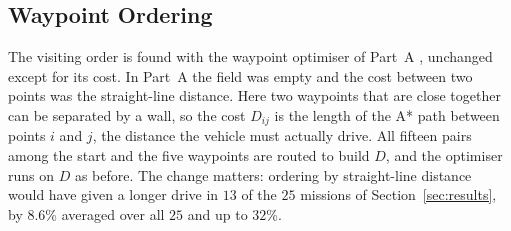 \subsection{Waypoint Ordering}
The visiting order is found with the waypoint optimiser of Part~A
\cite{blum2024, partA_group}, unchanged except for its cost. In
Part~A the field was empty and the cost between two points was the
straight-line distance. Here two waypoints that are close together can be
separated by a wall, so the cost $D_{ij}$ is the length of the A* path
between points $i$ and $j$, the distance the vehicle must actually drive.
All fifteen pairs among the start and the five waypoints are routed to
build $D$, and the optimiser runs on $D$ as before. The change matters:
ordering by straight-line distance would have given a longer drive in
$13$ of the $25$ missions of Section~\ref{sec:results}, by $8.6$\% averaged
over all $25$ and up to $32$\%.
